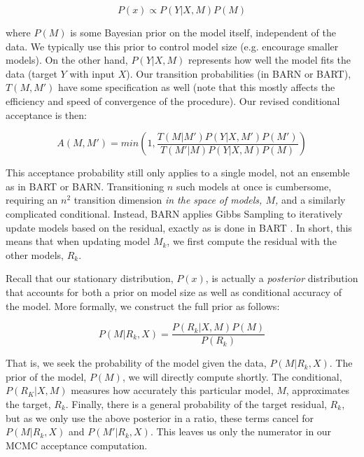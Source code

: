 \documentclass[12pt]{article}
\begin{document}
$$
P(x) \propto P(Y|X,M) P(M)
$$

where $P(M)$ is some Bayesian prior on the model itself, independent of the data.  We typically use this prior to control model size (e.g. encourage smaller models).  On the other hand, $P(Y|X,M)$ represents how well the model fits the data (target $Y$ with input $X$).  Our transition probabilities (in BARN or BART), $T(M,M')$ have some specification as well (note that this mostly affects the efficiency and speed of convergence of the procedure).  Our revised conditional acceptance is then:

$$
A(M,M') = min(1, \frac{T(M|M') P(Y|X,M')P(M')}{T(M'|M) P(Y|X,M)P(M)})
$$

This acceptance probability still only applies to a single model, not an ensemble as in BART or BARN.  Transitioning $n$ such models at once is cumbersome, requiring an $n^2$ transition dimension \emph{in the space of models, $M$,} and a similarly complicated conditional.  Instead, BARN applies Gibbs Sampling to iteratively update models based on the residual, exactly as is done in BART \cite{chipman2010bart}.  In short, this means that when updating model $M_k$, we first compute the residual with the other models, $R_k$.

Recall that our stationary distribution, $P(x)$, is actually a \emph{posterior} distribution that accounts for both a prior on model size as well as conditional accuracy of the model.  More formally, we construct the full prior as follows:

$$
P(M|R_k,X) = \frac{P(R_k|X,M)P(M)}{P(R_k)}
$$

That is, we seek the probability of the model given the data, $P(M|R_k,X)$.  The prior of the model, $P(M)$, we will directly compute shortly.  The conditional, $P(R_K|X,M)$ measures how accurately this particular model, $M$, approximates the target, $R_k$.  Finally, there is a general probability of the target residual, $R_k$, but as we only use the above posterior in a ratio, these terms cancel for $P(M|R_k,X)$ and $P(M'|R_k,X)$.  This leaves us only the numerator in our MCMC acceptance computation.
\end{document}
